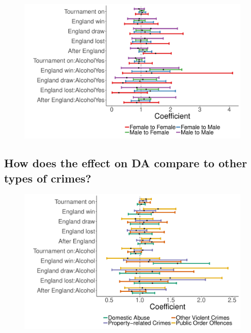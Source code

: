 \documentclass[12pt, letterpaper]{article}
\begin{document}
\begin{figure}[htb!]
\centering
\includegraphics[width=1\textwidth]{DA_gender_compare.pdf}
\label{fig:DA_compare}
\end{figure}

\newpage

\subsection{How does the effect on DA compare to other types of crimes?}


\begin{figure}[htb!]
\centering
\includegraphics[width=1\textwidth]{DA_compare.pdf}
\label{fig:DA_compare}
\end{figure}

\newpage
\end{document}
